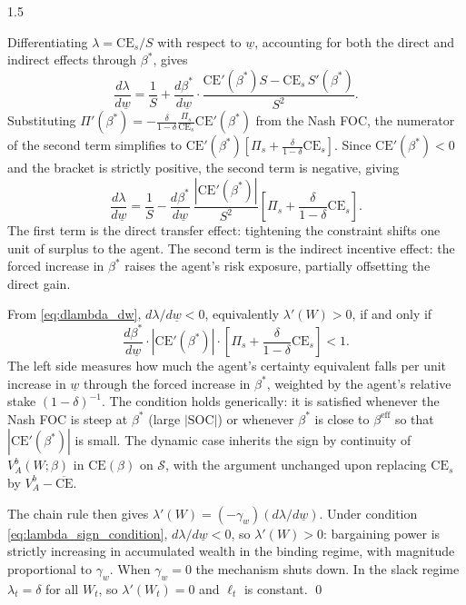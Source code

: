 \documentclass[12pt]{article}
\theoremstyle{definition}
\theoremstyle{plain}
\begin{document}
\begin{spacing}{1.5}
\begin{appendices}
    Differentiating $\lambda = \mathrm{CE}_s/S$ with respect to $\underline{w}$, accounting for both the direct and indirect effects through $\beta^*$, gives
    \[
    \frac{d\lambda}{d\underline{w}} = \frac{1}{S} + \frac{d\beta^*}{d\underline{w}} \cdot \frac{\mathrm{CE}'(\beta^*)S - \mathrm{CE}_s\,S'(\beta^*)}{S^2}.
    \]
    Substituting $\Pi'(\beta^*) = -\frac{\delta}{1-\delta}\frac{\Pi_s}{\mathrm{CE}_s}\mathrm{CE}'(\beta^*)$ from the Nash FOC, the numerator of the second term simplifies to $\mathrm{CE}'(\beta^*)[\Pi_s + \frac{\delta}{1-\delta}\mathrm{CE}_s]$. Since $\mathrm{CE}'(\beta^*) < 0$ and the bracket is strictly positive, the second term is negative, giving
    \begin{equation}\label{eq:dlambda_dw}
    \frac{d\lambda}{d\underline{w}} = \frac{1}{S} - \frac{d\beta^*}{d\underline{w}} \ \frac{|\mathrm{CE}'(\beta^*)|}{S^2}\left[\Pi_s + \frac{\delta}{1-\delta}\mathrm{CE}_s\right].
    \end{equation}
    The first term is the direct transfer effect: tightening the constraint shifts one unit of surplus to the agent. The second term is the indirect incentive effect: the forced increase in $\beta^*$ raises the agent's risk exposure, partially offsetting the direct gain.

    From \eqref{eq:dlambda_dw}, $d\lambda/d\underline{w} < 0$, equivalently $\lambda'(W) > 0$, if and only if
    \begin{equation}\label{eq:lambda_sign_condition}
    \frac{d\beta^*}{d\underline{w}} \cdot |\mathrm{CE}'(\beta^*)| \cdot \left[\Pi_s + \frac{\delta}{1-\delta}\mathrm{CE}_s\right] < 1.
    \end{equation}
    The left side measures how much the agent's certainty equivalent falls per unit increase in $\underline{w}$ through the forced increase in $\beta^*$, weighted by the agent's relative stake $(1-\delta)^{-1}$. The condition holds generically: it is satisfied whenever the Nash FOC is steep at $\beta^*$ (large $|\mathrm{SOC}|$) or whenever $\beta^*$ is close to $\beta^{\mathrm{eff}}$ so that $|\mathrm{CE}'(\beta^*)|$ is small. The dynamic case inherits the sign by continuity of $V_A^b(W;\beta)$ in $\mathrm{CE}(\beta)$ on $\mathcal{S}$, with the argument unchanged upon replacing $\mathrm{CE}_s$ by $V_A^b - \overline{\text{CE}}$.

    The chain rule then gives $\lambda'(W) = (-\gamma_w)(d\lambda/d\underline{w})$. Under condition \eqref{eq:lambda_sign_condition}, $d\lambda/d\underline{w} < 0$, so $\lambda'(W) > 0$: bargaining power is strictly increasing in accumulated wealth in the binding regime, with magnitude proportional to $\gamma_w$. When $\gamma_w = 0$ the mechanism shuts down. In the slack regime $\lambda_t = \delta$ for all $W_t$, so $\lambda'(W_t) = 0$ and $\ell_t$ is constant. \qed


\end{appendices}
\end{spacing}
\end{document}
